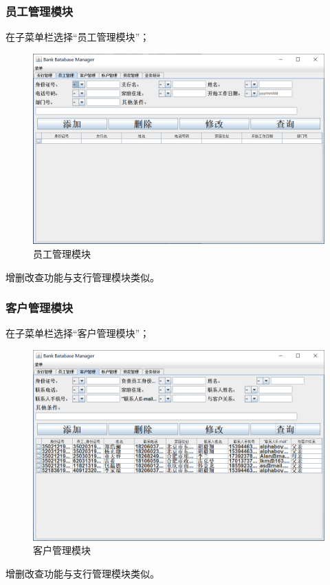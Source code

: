 \documentclass{ctexart}
\begin{document}
\subsubsection{\hei 员工管理模块}
在子菜单栏选择“员工管理模块”；
\par 
\begin{figure}[H]
    \centering
    \includegraphics[scale=0.2]{yggl.png}
    \caption{员工管理模块}
\end{figure}
增删改查功能与支行管理模块类似。
\subsubsection{\hei 客户管理模块}
在子菜单栏选择“客户管理模块”；
\par 
\begin{figure}[H]
    \centering
    \includegraphics[scale=0.2]{khgl.png}
    \caption{客户管理模块}
\end{figure}
增删改查功能与支行管理模块类似。
\end{document}

